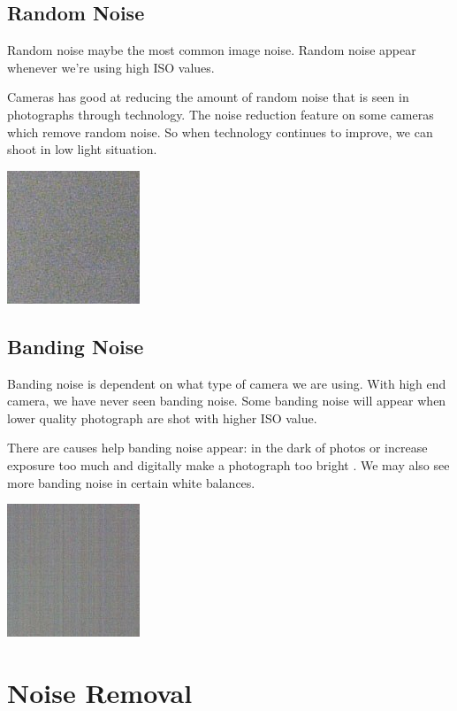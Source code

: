 \documentclass[10pt]{article}
\begin{document}
\subsection{Random Noise}
Random noise maybe the most common image noise. Random noise appear whenever we’re using high ISO values.

Cameras has good at reducing the amount of random noise that is seen in photographs through technology. The noise reduction feature on some cameras which remove random noise. So when technology continues to improve, we can shoot in low light situation. 

\begin{center}
	\includegraphics{random.png}
\end{center}

\subsection{Banding Noise}
Banding noise is dependent on what type of camera we are using. With high end camera, we have never seen banding noise. Some banding noise will appear when lower quality photograph are shot with higher ISO value.

There are causes help banding noise appear: in the dark of photos or increase exposure too much and digitally make a photograph too bright . We may also see more banding noise in certain white balances.


\begin{center}
	\includegraphics{banding.png}
\end{center}


\section{Noise Removal}
\end{document}
